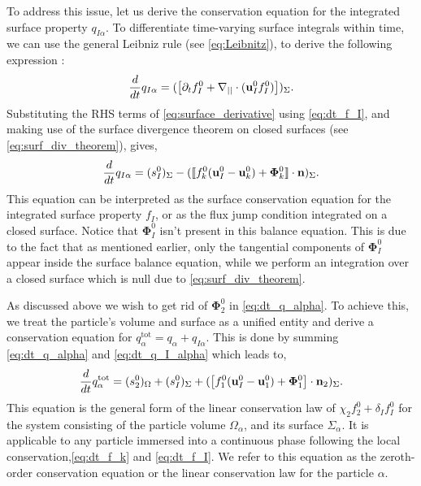 To address this issue, let us derive the conservation equation for the integrated surface property $q_{I\alpha}$.
To differentiate time-varying surface integrals within time, we can use the general Leibniz rule (see \ref{eq:Leibnitz}), to derive the following expression :
\begin{equation}
    \frac{d}{d t}  q_{I\alpha}
    = (  \left[
        \partial_t f_I^0
        +   \mathbf{\nabla}_{||} \cdot (\textbf{u}_I^0f_I^0)
    \right] )_{\Sigma}.
    \label{eq:surface_derivative}
\end{equation}
Substituting the RHS terms of \ref{eq:surface_derivative} using \ref{eq:dt_f_I}, and making use of the surface divergence theorem on closed surfaces (see \ref{eq:surf_div_theorem}), gives,
\begin{equation}
    \frac{d}{d t}  q_{I\alpha}
    = (  
        s_I^0
     )_{\Sigma}
    - (  \llbracket 
        f_k^0 (\textbf{u}_I^0 - \textbf{u}_k^0)
        + \mathbf{\Phi}_k^0
     \rrbracket \cdot \textbf{n} )_{\Sigma}.
    \label{eq:dt_q_I_alpha}
\end{equation}
This equation can be interpreted as the surface conservation equation for the integrated surface property $f_I$, or as the flux jump condition integrated on a closed surface. 
Notice that $\bm{\Phi}_{I}^0$ isn't present in this balance equation. 
This is due to the fact that as mentioned earlier, only the tangential components of $\bm{\Phi}_{I}^0$ appear inside the surface balance equation, while we perform an integration over a closed surface which is null due to \ref{eq:surf_div_theorem}. 

As discussed above we wish to get rid of $\mathbf{\Phi}_2^0$ in \ref{eq:dt_q_alpha}. To achieve this, we treat the particle's volume and surface as a unified entity and derive a conservation equation for $q_\alpha^\text{tot} = q_\alpha + q_{I\alpha}$. 
This is done by summing \ref{eq:dt_q_alpha} and \ref{eq:dt_q_I_alpha} which leads to, 
\begin{equation}
    \frac{d}{d t}  q_\alpha^\text{tot}
    = 
    (  s_2^0  )_{\Omega}
    + (  s_I^0  )_{\Sigma}
    + (  \left[
        f_1^0 (\textbf{u}_I^0-\textbf{u}_1^0) 
        + \mathbf{\Phi}_1^0 
        \right] \cdot \textbf{n}_2  )_{\Sigma}. 
    \label{eq:dt_q_alpha_tot}
\end{equation}
This equation is the general form of the linear conservation law of $\chi_2 f_2^0 + \delta_I f_I^0$ for the system consisting of the particle volume $\Omega_\alpha$, and its surface $\Sigma_\alpha$. It is applicable to any particle immersed into a continuous phase following the local conservation,\ref{eq:dt_f_k} and \ref{eq:dt_f_I}.
We refer to this equation as the zeroth-order conservation equation or the linear conservation law for the particle $\alpha$.

